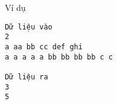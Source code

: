 Ví dụ
\begin{verbatim}
Dữ liệu vào
2
a aa bb cc def ghi
a a a a a bb bb bb bb c c	

Dữ liệu ra
3
5
\end{verbatim}